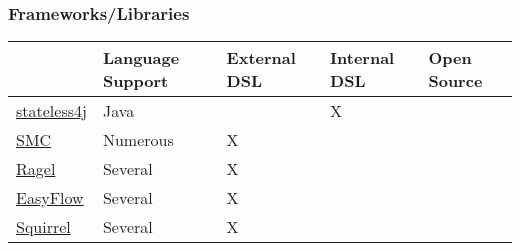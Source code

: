 \documentclass{beamer}
\begin{document}
%
%


\begin{frame}
  \frametitle{Frameworks/Libraries }
  \begin{tabularx}{\textwidth}{ |X|X|X|X|X| }
    \hline
    & Language Support & External DSL & Internal DSL & Open Source \\
    \hline
    \href{https://code.google.com/p/stateless4j/}{stateless4j} & Java & & X & \\ 
    \hline
     \href{http://smc.sourceforge.net/}{SMC} &Numerous & X & & \\ 
    \hline
     \href{http://www.complang.org/ragel/}{Ragel} & Several & X & & \\ 
    \hline
     \href{https://github.com/Beh01der/EasyFlow/}{EasyFlow} & Several &
    X & & \\ 
    \hline
     \href{https://github.com/hekailiang/squirrel}{Squirrel} & Several & X & & \\ 
    \hline
    \end{tabularx}
\end{frame}
\end{document}
